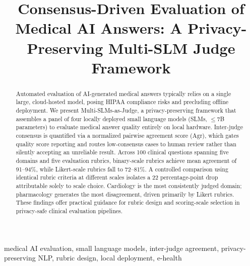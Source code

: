 \documentclass[conference]{IEEEtran}
\begin{document}
\title{Consensus-Driven Evaluation of Medical AI Answers:
A Privacy-Preserving Multi-SLM Judge Framework}

\author{
\and
{}
}

\maketitle

\begin{abstract}
Automated evaluation of AI-generated medical answers typically relies
on a single large, cloud-hosted model, posing HIPAA compliance risks
and precluding offline deployment. We present Multi-SLMs-as-Judge,
a privacy-preserving framework that assembles a panel of four locally
deployed small language models (SLMs, $\leq$7B parameters) to evaluate
medical answer quality entirely on local hardware. Inter-judge consensus
is quantified via a normalized pairwise agreement score ($\mathrm{Agr}$),
which gates quality score reporting and routes low-consensus cases to
human review rather than silently accepting an unreliable result.
Across 100 clinical questions spanning five domains and five evaluation
rubrics, binary-scale rubrics achieve mean agreement of 91--94\%, while
Likert-scale rubrics fall to 72--81\%. A controlled comparison using
identical rubric criteria at different scales isolates a 22
percentage-point drop attributable solely to scale choice. Cardiology
is the most consistently judged domain; pharmacology generates the most
disagreement, driven primarily by Likert rubrics. These findings offer
practical guidance for rubric design and scoring-scale selection in
privacy-safe clinical evaluation pipelines.
\end{abstract}

\begin{IEEEkeywords}
medical AI evaluation, small language models, inter-judge agreement,
privacy-preserving NLP, rubric design, local deployment, e-health
\end{IEEEkeywords}
\end{document}
